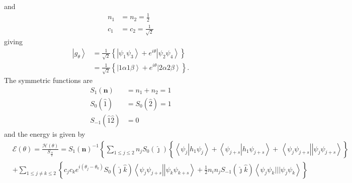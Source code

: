 \documentclass[aps,preprint]{revtex4}%
\begin{document}
and%
\begin{align*}
n_{1}  &  =n_{2}=\frac{1}{2}\\
c_{1}  &  =c_{2}=\frac{1}{\sqrt{2}}%
\end{align*}
giving%
\begin{align*}
\left\vert g_{\theta}\right\rangle  &  =\frac{1}{\sqrt{2}}\left\{  \left\vert
\psi_{1}\psi_{3}\right\rangle +e^{i\theta}\left\vert \psi_{2}\psi
_{4}\right\rangle \right\} \\
&  =\frac{1}{\sqrt{2}}\left\{  \left\vert 1\alpha1\beta\right\rangle
+e^{i\theta}\left\vert 2\alpha2\beta\right\rangle \right\}  .
\end{align*}
The symmetric functions are
\begin{align*}
S_{1}\left(  \mathbf{n}\right)   &  =n_{1}+n_{2}=1\\
S_{0}\left(  \hat{1}\right)   &  =S_{0}\left(  \hat{2}\right)  =1\\
S_{-1}\left(  \hat{1}\hat{2}\right)   &  =0
\end{align*}
and the energy is given by%
\begin{align*}
&  \mathcal{E}\left(  \theta\right)  =\frac{\mathcal{H}\left(  \theta\right)
}{S_{\frac{N}{2}}}=S_{1}\left(  \mathbf{n}\right)  ^{-1}\left\{  \sum_{1\leq
j\leq2}n_{j}S_{0}\left(  \hat{\jmath}\right)  \left\{  \overset{}{\left\langle
\psi_{j}\left\vert h_{1}\psi_{j}\right.  \right\rangle +\left\langle
\psi_{j+s}\left\vert h_{1}\psi_{j+s}\right.  \right\rangle }+\,\left\langle
\psi_{j}\psi_{j+s}\right\vert \left\vert \psi_{j}\psi_{j+s}\right\rangle
\right\}  \right. \\
&  +\sum_{1\leq j\neq k\leq2}\left\{  c_{j}c_{k}e^{i\left(  \theta_{j}%
-\theta_{k}\right)  }S_{0}\left(  \hat{\jmath}\hat{k}\right)  \left\langle
\psi_{j}\psi_{j+s}\right\vert \left\vert \psi_{k}\psi_{k+s}\right\rangle
+\frac{1}{2}\overset{}{n_{i}n_{j}S_{-1}\left(  \hat{\jmath}\hat{k}\right)
\left\langle \psi_{j}\psi_{k}|||\psi_{j}\psi_{k}\right\rangle }\right\}
\end{align*}%
\end{document}
